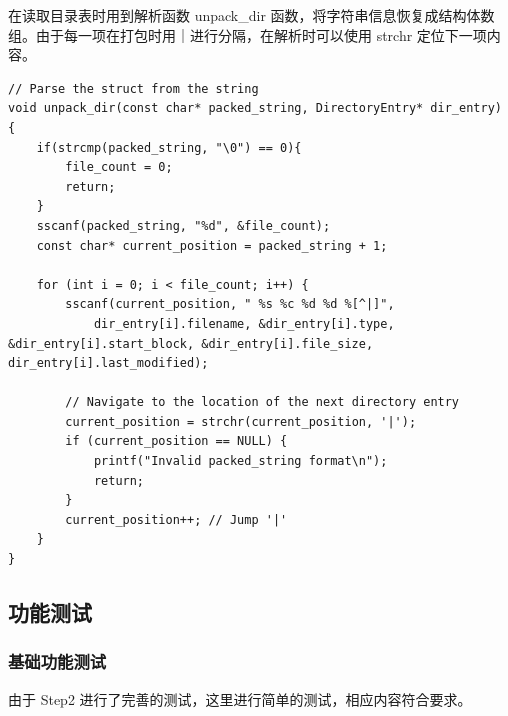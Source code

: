 \documentclass{article}
\begin{document}
在读取目录表时用到解析函数 unpack\_dir 函数，将字符串信息恢复成结构体数组。由于每一项在打包时用｜进行分隔，在解析时可以使用 strchr 定位下一项内容。

\begin{lstlisting}
// Parse the struct from the string
void unpack_dir(const char* packed_string, DirectoryEntry* dir_entry) {
    if(strcmp(packed_string, "\0") == 0){
        file_count = 0;
        return;
    }
    sscanf(packed_string, "%d", &file_count);
    const char* current_position = packed_string + 1;

    for (int i = 0; i < file_count; i++) {
        sscanf(current_position, " %s %c %d %d %[^|]",
            dir_entry[i].filename, &dir_entry[i].type, &dir_entry[i].start_block, &dir_entry[i].file_size, dir_entry[i].last_modified);
        
        // Navigate to the location of the next directory entry
        current_position = strchr(current_position, '|');
        if (current_position == NULL) {
            printf("Invalid packed_string format\n");
            return;
        }
        current_position++; // Jump '|'
    }
}
\end{lstlisting}

\subsection{功能测试}

\subsubsection{基础功能测试}

由于 Step2 进行了完善的测试，这里进行简单的测试，相应内容符合要求。
\end{document}
